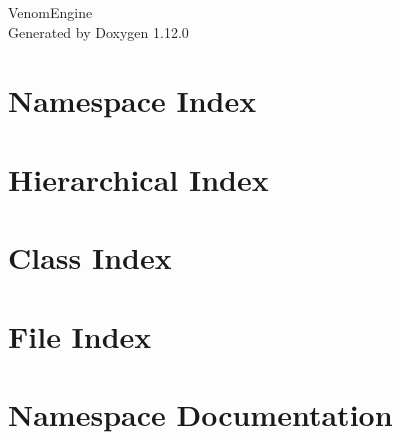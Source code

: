 \documentclass[twoside]{book}
\newcommand{\+}{\discretionary{\mbox{\scriptsize$\hookleftarrow$}}{}{}}
\newcommand{\clearemptydoublepage}{%
    \newpage{\pagestyle{empty}\cleardoublepage}%
  }
\begin{document}
  \raggedbottom
    \hypersetup{pageanchor=false,
                bookmarksnumbered=true,
                pdfencoding=unicode
               }
  \begin{titlepage}
  \vspace*{7cm}
  \begin{center}%
  {\Large Venom\+Engine}\\
  \vspace*{1cm}
  {\large Generated by Doxygen 1.12.0}\\
  \end{center}
  \end{titlepage}
  \clearemptydoublepage
  \tableofcontents
  \clearemptydoublepage
  \hypersetup{pageanchor=true}



\chapter{Namespace Index}

\chapter{Hierarchical Index}

\chapter{Class Index}

\chapter{File Index}

\chapter{Namespace Documentation}



\end{document}
